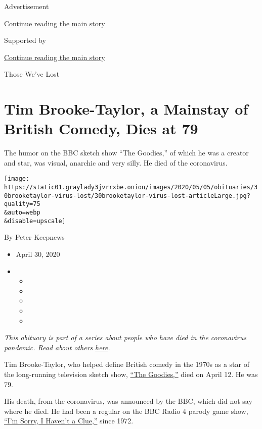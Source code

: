 Advertisement

\protect\hyperlink{after-top}{Continue reading the main story}

Supported by

\protect\hyperlink{after-sponsor}{Continue reading the main story}

Those We've Lost

\hypertarget{tim-brooke-taylor-a-mainstay-of-british-comedy-dies-at-79}{%
\section{Tim Brooke-Taylor, a Mainstay of British Comedy, Dies at
79}\label{tim-brooke-taylor-a-mainstay-of-british-comedy-dies-at-79}}

The humor on the BBC sketch show ``The Goodies,'' of which he was a
creator and star, was visual, anarchic and very silly. He died of the
coronavirus.

\texttt{[image: https://static01.graylady3jvrrxbe.onion/images/2020/05/05/obituaries/30brooketaylor-virus-lost/30brooketaylor-virus-lost-articleLarge.jpg?quality=75\\\&auto=webp\\\&disable=upscale]}

By Peter Keepnews

\begin{itemize}
\item
  April 30, 2020
\item
  \begin{itemize}
  \item
  \item
  \item
  \item
  \item
  \end{itemize}
\end{itemize}

\emph{This obituary is part of a series about people who have died in
the coronavirus pandemic. Read about others}
\href{https://www.nytimes3xbfgragh.onion/series/people-who-have-died-of-the-coronavirus}{\emph{here}}\emph{.}

Tim Brooke-Taylor, who helped define British comedy in the 1970s as a
star of the long-running television sketch show,
\href{https://www.youtube.com/watch?v=y7lbqiE3LWQ}{``The Goodies,''}
died on April 12. He was 79.

His death, from the coronavirus, was announced by the BBC, which did not
say where he died. He had been a regular on the BBC Radio 4 parody game
show, \href{https://www.youtube.com/watch?v=aRFzVdvNQXo}{``I'm Sorry, I
Haven't a Clue,''} since 1972.

